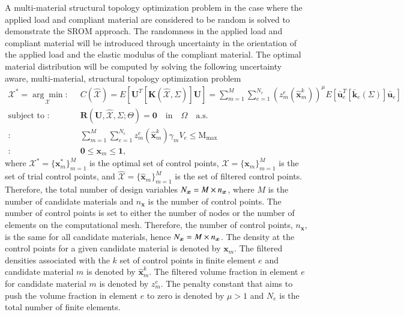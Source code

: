 A multi-material structural topology optimization problem in the case where the applied load and compliant material are considered to be random is solved to demonstrate the SROM approach. The randomness in the applied load and compliant material will be introduced through uncertainty in the orientation of the applied load and the elastic modulus of the compliant material. The optimal material distribution will be computed by solving the following uncertainty aware, multi-material, structural topology optimization problem
\begin{equation}
\label{topOptProblemIntro}
\begin{aligned}
\mathcal{X}^{\ast}=\underset{\mathcal{X}}{\arg \min}: & \;\; {C}(\widehat{\mathcal{X}}) = E \left[ \bm U^T [\bm K(\widehat{\mathcal{X}},\Sigma)] \bm U \right] = \sum_{m=1}^{M}\sum_{e=1}^{N_e} (z_m^e(\hat{\bm x}^k_m))^{\mu}  E \left[  \bar{\bm u}_e^T [\bar{\bm k}_e(\Sigma)] \bar{\bm u}_e \right] \\
\text{subject to } : & \;\; \bm{R}(\bm U,\widehat{\mathcal{X}}, \Sigma; \Theta) = \bm 0 \quad\mbox{in}\quad\Omega\quad\mbox{a.s.} \\
			 :  & \;\; \sum_{m=1}^{M}\sum_{e=1}^{N_e} z_m^e(\hat{\bm x}^k_m)\gamma_mV_e \leq \mathrm{M}_{\max} \\
			 : & \;\; \bm 0 \leq \bm x_m \leq \bm 1,
\end{aligned} 
\end{equation}
where $\mathcal{X}^{\ast}=\{{\bm x}^{\ast}_m\}_{m=1}^M$ is the optimal set of control points, $\mathcal{X}=\{{\bm x}_m\}_{m=1}^M$ is the set of trial control points, and $\widehat{\mathcal{X}}=\{\hat{\bm x}_m\}_{m=1}^M$ is the set of filtered control points. Therefore, the total number of design variables $N_{\tiny{\bm x}}=M\times n_{\bm x}$, where $M$ is the number of candidate materials and $n_{\bm x}$ is the number of control points. The number of control points is set to either the number of nodes or the number of elements on the computational mesh. Therefore, the number of control points, $n_{\bm x}$, is the same for all candidate materials, hence $N_{\tiny{\bm x}}=M\times n_{\bm x}$. The density at the control points for a given candidate material is denoted by $\bm x_m$. The filtered densities associated with the $k$ set of control points in finite element $e$ and candidate material $m$ is denoted by $\hat{\bm x}^k_m$. The filtered volume fraction in element $e$ for candidate material $m$ is denoted by $z_m^e$. The penalty constant that aims to push the volume fraction in element $e$ to zero is denoted by $\mu>1$ and $N_e$ is the total number of finite elements. \\

